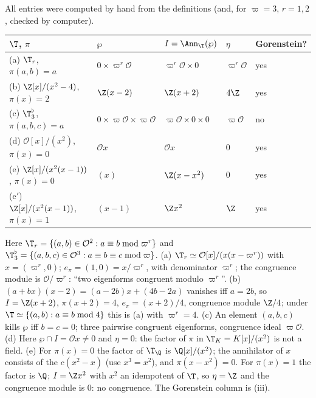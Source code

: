 \begin{example}\label{ex:modules:toy-congruence}
All entries were computed by hand from the definitions (and, for $\varpi=3$, $r=1,2$, checked by computer).
\begin{center}\small
\begin{tabular}{lllll}
\toprule
$\T$, $\pi$ & $\wp$ & $I=\Ann_\T(\wp)$ & $\eta$ & Gorenstein?\\
\midrule
(a) $\T_r$, $\pi(a,b)=a$ & $0\times\varpi^r\mathcal O$ & $\varpi^r\mathcal O\times0$ & $\varpi^r\mathcal O$ & yes\\
(b) $\Z[x]/(x^2-4)$, $\pi(x)=2$ & $\Z(x-2)$ & $\Z(x+2)$ & $4\Z$ & yes\\
(c) $\T^\flat_3$, $\pi(a,b,c)=a$ & $0\times\varpi\mathcal O\times\varpi\mathcal O$ & $\varpi\mathcal O\times0\times0$ & $\varpi\mathcal O$ & no\\
(d) $\mathcal O[x]/(x^2)$, $\pi(x)=0$ & $\mathcal Ox$ & $\mathcal Ox$ & $0$ & yes\\
(e) $\Z[x]/(x^2(x-1))$, $\pi(x)=0$ & $(x)$ & $\Z(x-x^2)$ & $0$ & yes\\
(e$'$) $\Z[x]/(x^2(x-1))$, $\pi(x)=1$ & $(x-1)$ & $\Z x^2$ & $\Z$ & yes\\
\bottomrule
\end{tabular}
\end{center}
Here $\T_r=\{(a,b)\in\mathcal O^2:a\equiv b\bmod\varpi^r\}$ and $\T^\flat_3=\{(a,b,c)\in\mathcal O^3:a\equiv b\equiv c\bmod\varpi\}$.
(a) $\T_r\simeq\mathcal O[x]/(x(x-\varpi^r))$ with $x=(\varpi^r,0)$; $e_\pi=(1,0)=x/\varpi^r$, with denominator $\varpi^r$; the congruence module is $\mathcal O/\varpi^r$: ``two eigenforms
congruent modulo $\varpi^r$''. (b) $(a+bx)(x-2)=(a-2b)x+(4b-2a)$ vanishes iff $a=2b$, so $I=\Z(x+2)$, $\pi(x+2)=4$, $e_\pi=(x+2)/4$, congruence module $\Z/4$; under
$\T\simeq\{(a,b):a\equiv b\bmod4\}$ this is (a) with $\varpi^r=4$. (c) An element $(a,b,c)$ kills $\wp$ iff $b=c=0$; three pairwise congruent eigenforms, congruence ideal $\varpi\mathcal O$.
(d) Here $\wp\cap I=\mathcal Ox\ne0$ and $\eta=0$: the factor of $\pi$ in $\T_K=K[x]/(x^2)$ is not a field. (e) For $\pi(x)=0$ the factor of $\T_\Q$ is $\Q[x]/(x^2)$; the
annihilator of $x$ consists of the $c(x^2-x)$ (use $x^3=x^2$), and $\pi(x-x^2)=0$. For $\pi(x)=1$ the factor is $\Q$; $I=\Z x^2$ with $x^2$ an idempotent of $\T$, so
$\eta=\Z$ and the congruence module is $0$: no congruence. The Gorenstein column is (iii).
\end{example}

